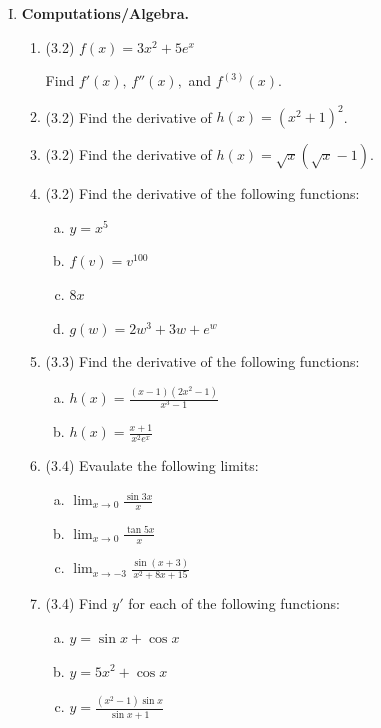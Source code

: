 \documentclass[11pt,letterpaper]{article}
\begin{document}
\begin{enumerate}[I.]
\begin{enumerate}[1.]
	\end{enumerate}	
\vspace{1pc}
\item \textbf{Computations/Algebra.} 
	\begin{enumerate}[1.]
	\item (3.2) $f(x)=3x^2+5e^x$
	
	Find $f'(x),\,f''(x),$ and $f^{(3)}(x)$.
	
	\item (3.2) Find the derivative of $h(x)=(x^2+1)^2$.
	
	\item (3.2) Find the derivative of $h(x)=\sqrt{x}\left(\sqrt{x}-1\right)$.
	
	\item (3.2) Find the derivative of the following functions:
		\begin{enumerate}[(a)]
		\item $y=x^5$
		\item $f(v)=v^{100}$
		\item $8x$
		\item $g(w)=2w^3+3w+e^w$
		\end{enumerate}
		
	\item (3.3) Find the derivative of the following functions:
		\begin{enumerate}[(a)]
		\item $\displaystyle h(x)=\frac{(x-1)(2x^2-1)}{x^3-1}$
		\item $\displaystyle h(x)=\frac{x+1}{x^2e^x}$
		\end{enumerate}
		
	\item (3.4) Evaulate the following limits:
		\begin{enumerate}[(a)]
		\item $\displaystyle\lim_{x\to 0}\frac{\sin{3x}}{x}$
		\item $\displaystyle\lim_{x\to 0}\frac{\tan{5x}}{x}$
		\item $\displaystyle\lim_{x\to -3}\frac{\sin{(x+3)}}{x^2+8x+15}$
		\end{enumerate}
	
	\item (3.4) Find $y'$ for each of the following functions:
		\begin{enumerate}[(a)]
		\item $y=\sin x+\cos x$
		\item $y=5x^2+\cos x$
		\item $\displaystyle y=\frac{(x^2-1)\sin x}{\sin x+1}$
		\end{enumerate}
	

\end{enumerate}
\end{enumerate}
\end{document}
